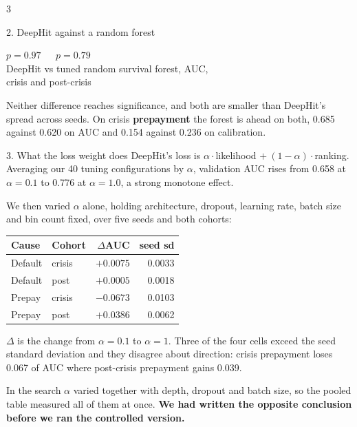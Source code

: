 \documentclass[final]{article}
\newcommand{\bignum}[2]{{\fontsize{64}{72}\selectfont\bfseries\color{accent}#1}\\[1mm]{\fontsize{32}{39}\selectfont #2}}
\begin{document}
\begin{multicols}{3}
\begin{panel}{2. DeepHit against a random forest}
\begin{center}
\bignum{$p=0.97$ \ \ $p=0.79$}{DeepHit vs tuned random survival forest, AUC,\\crisis and post-crisis}
\end{center}

\vspace{3mm}
Neither difference reaches significance, and both are smaller than DeepHit's
spread across seeds. On crisis \textbf{prepayment} the forest is ahead on both,
0.685 against 0.620 on AUC and 0.154 against 0.236 on calibration.
\end{panel}

\begin{panel}{3. What the loss weight does}
DeepHit's loss is $\alpha\cdot$likelihood $+\ (1-\alpha)\cdot$ranking. Averaging
our 40 tuning configurations by $\alpha$, validation AUC rises from 0.658 at
$\alpha{=}0.1$ to 0.776 at $\alpha{=}1.0$, a strong monotone effect.

\vspace{5mm}
We then varied $\alpha$ alone, holding architecture, dropout, learning rate,
batch size and bin count fixed, over five seeds and both cohorts:

\vspace{4mm}
\begin{tabular}{@{}llrr@{}}
\toprule
Cause & Cohort & $\Delta$AUC & seed sd \\
\midrule
Default & crisis & $+0.0075$ & 0.0033 \\
Default & post & $+0.0005$ & 0.0018 \\
Prepay & crisis & $\mathbf{-0.0673}$ & 0.0103 \\
Prepay & post & $\mathbf{+0.0386}$ & 0.0062 \\
\bottomrule
\end{tabular}

\vspace{5mm}
$\Delta$ is the change from $\alpha{=}0.1$ to $\alpha{=}1$. Three of the four
cells exceed the seed standard deviation and they disagree about direction:
crisis prepayment loses 0.067 of AUC where post-crisis prepayment gains 0.039.

\vspace{5mm}
In the search $\alpha$ varied together with depth, dropout and batch size, so the
pooled table measured all of them at once. \textbf{We had written the
opposite conclusion before we ran the controlled version.}
\end{panel}


\end{multicols}
\end{document}
